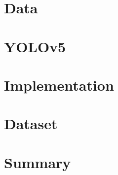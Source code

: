 \section{Data}\label{sec:app:data}

\section{YOLOv5}\label{sec:app:yolov5}

\section{Implementation}\label{sec:app:impl}

\section{Dataset}\label{sec:app:dataset}

\section{Summary}\label{sec:app:summary}
